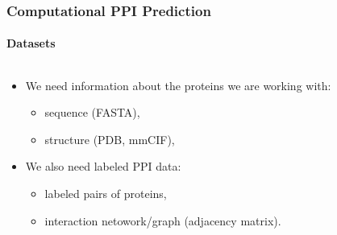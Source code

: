 
\begin{frame}[fragile]
  \frametitle{Computational PPI Prediction}
  \framesubtitle{Datasets}

  \begin{columns}
    \begin{column}{\textwidth}
      \vspace{-2em}

      \begin{itemize}
        \item<1-> We need information about the proteins we are working with:
              \begin{itemize}
                \item sequence (FASTA),
                \item structure (PDB, mmCIF),
                
              \end{itemize}
        \item<2-> We also need labeled PPI data:
              \begin{itemize}
                \item labeled pairs of proteins,
                \item interaction netowork/graph (adjacency matrix).
              \end{itemize}
      \end{itemize}
    \end{column}
  \end{columns}

\end{frame}


